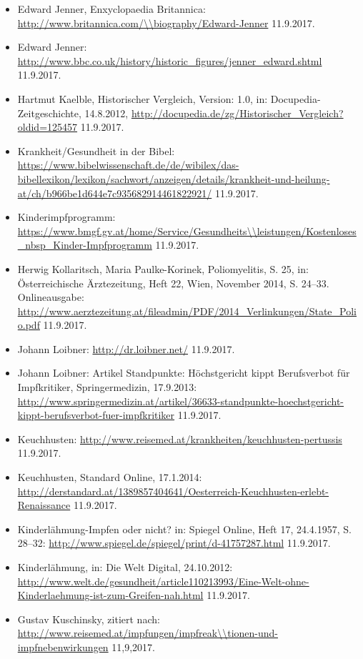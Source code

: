 \documentclass[
    a4paper,
    12pt,
    hyphens,
    chapterprefix=true,
    headheight=33pt,
    footheight=29pt,
    headings=optiontohead,
]{scrartcl}
\begin{document}
{\begin{itemize}
\item{Edward Jenner, Enxyclopaedia Britannica: \url{http://www.britannica.com/\\biography/Edward-Jenner} 11.9.2017.}
\item{Edward Jenner: \url{http://www.bbc.co.uk/history/historic_figures/jenner_edward.shtml} 11.9.2017.}
\item{Hartmut Kaelble, Historischer Vergleich, Version: 1.0, in: Docupedia-Zeitgeschichte, 14.8.2012, \url{http://docupedia.de/zg/Historischer_Vergleich?oldid=125457} 11.9.2017.}
\item{Krankheit/Gesundheit in der Bibel: \url{https://www.bibelwissenschaft.de/de/wibilex/das-bibellexikon/lexikon/sachwort/anzeigen/details/krankheit-und-heilung-at/ch/b966be1d644e7c935682914461822921/} 11.9.2017.}
\item{Kinderimpfprogramm: \url{https://www.bmgf.gv.at/home/Service/Gesundheits\\leistungen/Kostenloses_nbsp_Kinder-Impfprogramm} 11.9.2017.}
\item{Herwig Kollaritsch, Maria Paulke-Korinek, Poliomyelitis, S. 25, in: Österreichische Ärztezeitung, Heft 22, Wien, November 2014, S. 24--33. Onlineausgabe: \url{http://www.aerztezeitung.at/fileadmin/PDF/2014_Verlinkungen/State_Polio.pdf} 11.9.2017.}
\item{Johann Loibner: \url{http://dr.loibner.net/} 11.9.2017.}
\item{Johann Loibner: Artikel Standpunkte: Höchstgericht kippt Berufsverbot für Impfkritiker, Springermedizin, 17.9.2013: \url{http://www.springermedizin.at/artikel/36633-standpunkte-hoechstgericht-kippt-berufsverbot-fuer-impfkritiker} 11.9.2017.}
\item{Keuchhusten: \url{http://www.reisemed.at/krankheiten/keuchhusten-pertussis} 11.9.2017.}
\item{Keuchhusten, Standard Online, 17.1.2014: \url{http://derstandard.at/1389857404641/Oesterreich-Keuchhusten-erlebt-Renaissance} 11.9.2017.}
\item{Kinderlähmung-Impfen oder nicht? in: Spiegel Online, Heft 17, 24.4.1957, S. 28--32: \url{http://www.spiegel.de/spiegel/print/d-41757287.html} 11.9.2017.}
\item{Kinderlähmung, in: Die Welt Digital, 24.10.2012: \url{http://www.welt.de/gesundheit/article110213993/Eine-Welt-ohne-Kinderlaehmung-ist-zum-Greifen-nah.html} 11.9.2017.}
\item{Gustav Kuschinsky, zitiert nach: \url{http://www.reisemed.at/impfungen/impfreak\\tionen-und-impfnebenwirkungen} 11,9,2017.}

\end{itemize}}
\end{document}
